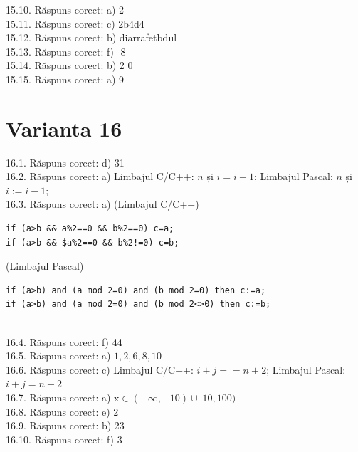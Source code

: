15.10. Răspuns corect: a) 2\\

15.11. Răspuns corect: c) 2b4d4\\

15.12. Răspuns corect: b) diarrafetbdul\\

15.13. Răspuns corect: f) -8\\

15.14. Răspuns corect: b) 2 0\\

15.15. Răspuns corect: a) 9\\

\section*{Varianta 16}

16.1. Răspuns corect: d) 31\\

16.2. Răspuns corect: a) Limbajul C/C++: $n$ și $i=i-1$; Limbajul Pascal: $n$ și $i:=i-1$;\\

16.3. Răspuns corect: a)
(Limbajul C/C++)
\begin{verbatim}
if (a>b && a%2==0 && b%2==0) c=a;
if (a>b && $a%2==0 && b%2!=0) c=b;
\end{verbatim}
(Limbajul Pascal)
\begin{verbatim}
if (a>b) and (a mod 2=0) and (b mod 2=0) then c:=a;
if (a>b) and (a mod 2=0) and (b mod 2<>0) then c:=b;
\end{verbatim}\\

16.4. Răspuns corect: f) 44\\

16.5. Răspuns corect: a) $1,2,6,8,10$\\

16.6. Răspuns corect: c) Limbajul C/C++: $i+j==n+2$; Limbajul Pascal: $i+j=n+2$\\

16.7. Răspuns corect: a) $\mathrm{x} \in(-\infty, -10) \cup[10, 100)$\\

16.8. Răspuns corect: e) 2\\

16.9. Răspuns corect: b) 23\\

16.10. Răspuns corect: f) 3\\

